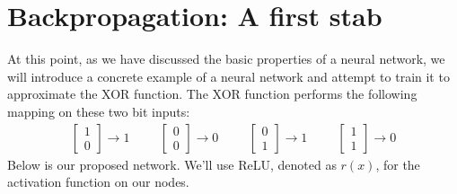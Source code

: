 \documentclass[12pt,letterpaper]{book}
\theoremstyle{definition}
\begin{document}
  \section{Backpropagation: A first stab}
  At this point, as we have discussed the basic properties of a neural network, 
  we will introduce a concrete example of a neural network and attempt to train it to 
  approximate the XOR function. The XOR function 
  performs the following mapping on these two bit inputs:
  \begin{align}
        \begin{bmatrix}
        1 \\ 0
      \end{bmatrix} \rightarrow 1 
      \hspace{1cm}
      \begin{bmatrix}
        0 \\ 0
      \end{bmatrix} \rightarrow 0
      \hspace{1cm}
      \begin{bmatrix}
        0 \\ 1
      \end{bmatrix} \rightarrow 1
      \hspace{1cm}
      \begin{bmatrix}
        1 \\ 1
      \end{bmatrix} \rightarrow 0
    \end{align}
  Below is our proposed network. We'll use ReLU, denoted as $r(x)$, 
  for the activation function on our nodes. 
\end{document}
